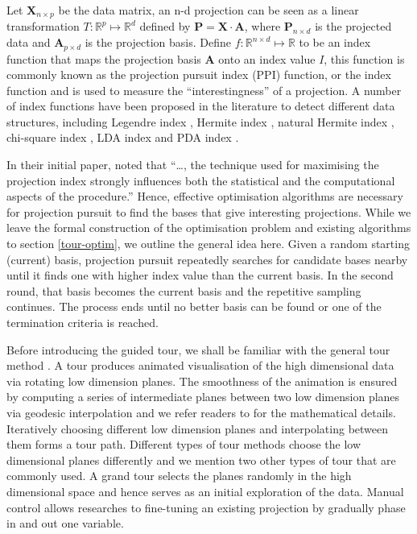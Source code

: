 \documentclass[12pt]{article}
\begin{document}
Let \(\mathbf{X}_{n \times p}\) be the data matrix, an n-d projection
can be seen as a linear transformation
\(T: \mathbb{R}^p \mapsto \mathbb{R}^d\) defined by
\(\mathbf{P} = \mathbf{X} \cdot \mathbf{A}\), where
\(\mathbf{P}_{n \times d}\) is the projected data and
\(\mathbf{A}_{p\times d}\) is the projection basis. Define
\(f: \mathbb{R}^{n \times d} \mapsto \mathbb{R}\) to be an index
function that maps the projection basis \(\mathbf{A}\) onto an index
value \(I\), this function is commonly known as the projection pursuit
index (PPI) function, or the index function and is used to measure the
``interestingness'' of a projection. A number of index functions have
been proposed in the literature to detect different data structures,
including Legendre index \citep{friedman1974projection}, Hermite index
\citep{hall1989polynomial}, natural Hermite index
\citep{cook1993projection}, chi-square index
\citep{posse1995projection}, LDA index \citep{lee2005projection} and PDA
index \citep{lee2010projection}.

In their initial paper, \citet{friedman1974projection} noted that
``\ldots{}, the technique used for maximising the projection index
strongly influences both the statistical and the computational aspects
of the procedure.'' Hence, effective optimisation algorithms are
necessary for projection pursuit to find the bases that give interesting
projections. While we leave the formal construction of the optimisation
problem and existing algorithms to section \ref{tour-optim}, we outline
the general idea here. Given a random starting (current) basis,
projection pursuit repeatedly searches for candidate bases nearby until
it finds one with higher index value than the current basis. In the
second round, that basis becomes the current basis and the repetitive
sampling continues. The process ends until no better basis can be found
or one of the termination criteria is reached.

Before introducing the guided tour, we shall be familiar with the
general tour method \citep{cook2008grand}. A tour produces animated
visualisation of the high dimensional data via rotating low dimension
planes. The smoothness of the animation is ensured by computing a series
of intermediate planes between two low dimension planes via geodesic
interpolation and we refer readers to \citet{buja2005computational} for
the mathematical details. Iteratively choosing different low dimension
planes and interpolating between them forms a tour path. Different types
of tour methods choose the low dimensional planes differently and we
mention two other types of tour that are commonly used. A grand tour
selects the planes randomly in the high dimensional space and hence
serves as an initial exploration of the data. Manual control allows
researches to fine-tuning an existing projection by gradually phase in
and out one variable.
\end{document}
